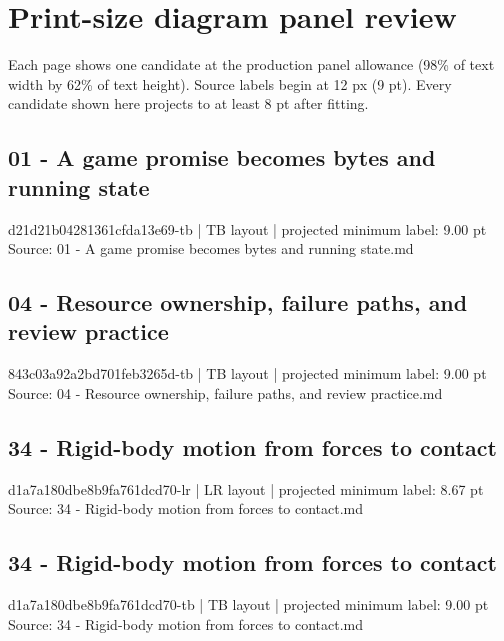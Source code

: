 \documentclass[10pt,twoside,openany]{book}
\begin{document}
\chapter*{Print-size diagram panel review}
Each page shows one candidate at the production panel allowance (98\% of text width by 62\% of text height). Source labels begin at 12 px (9 pt). Every candidate shown here projects to at least 8 pt after fitting.
\clearpage
\section*{01 - A game promise becomes bytes and running state}
\small d21d21b04281361cfda13e69-tb | TB layout | projected minimum label: 9.00 pt\\
\small Source: 01 - A game promise becomes bytes and running state.md
\vspace{1em}
\begin{center}
\end{center}
\clearpage
\section*{04 - Resource ownership, failure paths, and review practice}
\small 843c03a92a2bd701feb3265d-tb | TB layout | projected minimum label: 9.00 pt\\
\small Source: 04 - Resource ownership, failure paths, and review practice.md
\vspace{1em}
\begin{center}
\end{center}
\clearpage
\section*{34 - Rigid-body motion from forces to contact}
\small d1a7a180dbe8b9fa761dcd70-lr | LR layout | projected minimum label: 8.67 pt\\
\small Source: 34 - Rigid-body motion from forces to contact.md
\vspace{1em}
\begin{center}
\end{center}
\clearpage
\section*{34 - Rigid-body motion from forces to contact}
\small d1a7a180dbe8b9fa761dcd70-tb | TB layout | projected minimum label: 9.00 pt\\
\small Source: 34 - Rigid-body motion from forces to contact.md
\vspace{1em}
\begin{center}
\end{center}
\clearpage
\end{document}
